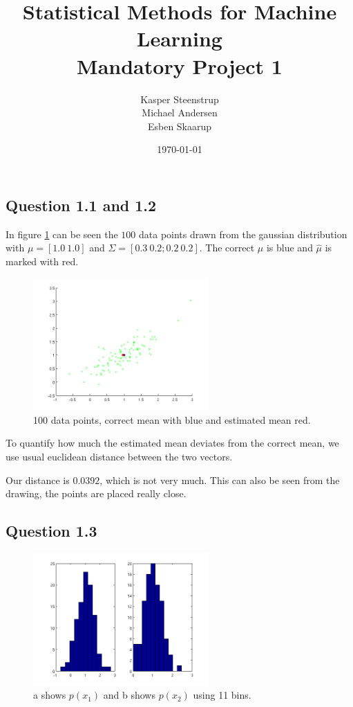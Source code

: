 \documentclass[a4paper, 10pt, final]{article}
\title{Statistical Methods for Machine Learning \\ Mandatory Project 1}
\author{Kasper Steenstrup\\Michael Andersen\\Esben Skaarup}
\date{\today}
\begin{document}
\maketitle

\subsection*{Question 1.1 and 1.2}

In figure \ref{fig:q1_1} can be seen the $100$ data points drawn from
the gaussian distribution with $\mu = [1.0~ 1.0]$ and $\Sigma = [0.3~
  0.2; 0.2~ 0.2]$. The correct $\mu$ is blue and $\widehat{\mu}$ is
marked with red.

\begin{figure}[!htpb]
  \centering
  \includegraphics[width=0.6\textwidth]{images/q1_1}
  \caption{100 data points, correct mean with blue and estimated mean red.}
  \label{fig:q1_1}
\end{figure}

To quantify how much the estimated mean deviates from the correct
mean, we use usual euclidean distance between the two vectors.

Our distance is $0.0392$, which is not very much. This can also be
seen from the drawing, the points are placed really close.

\subsection*{Question 1.3}

\begin{figure}[!htpbpb]
  \centering
  \includegraphics[width=0.6\textwidth]{images/q1_3a}
  \caption{a shows $p(x_1)$ and b shows $p(x_2)$ using 11 bins.}
  \label{fig:q1_3a}
\end{figure}
\end{document}
